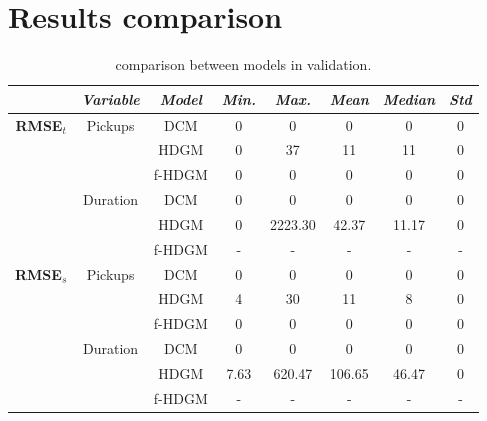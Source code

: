 \section{Results comparison}
\begin{table}[h!]
	\centering
	\renewcommand\arraystretch{1.3}
	\begin{tabular}{c|c|c|c|c|c|c|c}
		\hline
		\textit{} & \textit{Variable} & \textit{Model} & \textit{Min.} & \textit{Max.} & \textit{Mean} & \textit{Median} & \textit{Std}\\
		\hline
		\multirow{6}{4em}{\textbf{RMSE$_t$}} & \multirow{3}{4em}{Pickups} & DCM & \num{0} & \num{0} & \num{0} & \num{0} & \num{0} \\ \cline{3-8}
		& & HDGM & \num{0} & \num{37} & \num{11} & \num{11} & \num{0} \\ \cline{3-8}
		& & f-HDGM & \num{0} & \num{0} & \num{0} & \num{0} & \num{0} \\ \cline{2-8}
		& \multirow{3}{4em}{Duration} & DCM & \num{0} & \num{0} & \num{0} & \num{0} & \num{0} \\ \cline{3-8} 
		& & HDGM & \num{0} & \num{2223.30} & \num{42.37} & \num{11.17} & \num{0} \\ \cline{3-8}
		& & f-HDGM & - & - & - & - & - \\
		\hline
		\multirow{6}{4em}{\textbf{RMSE$_s$}} & \multirow{3}{4em}{Pickups} & DCM & \num{0} & \num{0} & \num{0} & \num{0} & \num{0} \\ \cline{3-8}
		& & HDGM & \num{4} & \num{30} & \num{11} & \num{8} & \num{0} \\ \cline{3-8}
		& & f-HDGM & \num{0} & \num{0} & \num{0} & \num{0} & \num{0} \\ \cline{2-8}
		& \multirow{3}{4em}{Duration} & DCM & \num{0} & \num{0} & \num{0} & \num{0} & \num{0} \\ \cline{3-8} 
		& & HDGM & \num{7.63} & \num{620.47} & \num{106.65} & \num{46.47} & \num{0} \\ \cline{3-8}
		& & f-HDGM & - & - & - & - & - \\
		\hline
	\end{tabular}
	\caption[Comparison between models in validation]{comparison between models in validation.}
	\label{RMSE_HDGM_stats}
\end{table}